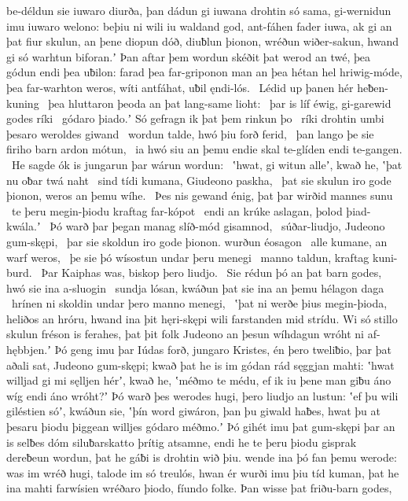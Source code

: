 be-déldun sie iuwaro diurða, þan dádun gi iuwana drohtin só sama,
gi-wernidun imu iuwaro welono: beþiu ni wili iu waldand god,
ant-fáhen fader iuwa, ak gi an þat fiur skulun,
an þene diopun dóð, diuƀlun þionon,
wréðun wiðer-sakun, hwand gi só warhtun biforan.ʼ
Þan aftar þem wordun skéðit þat werod an twé,
þea gódun endi þea uƀilon: farad þea far-griponon man
an þea hétan hel hriwig-móde,
þea far-warhton weros, wíti antfáhat,
uƀil ęndi-lós. \hld\ Lédid up þanen
hér heƀen-kuning \hld\ þea hluttaron þeoda
an þat lang-same lioht: \hld\ þar is líf éwig,
gi-garewid godes ríki \hld\ gódaro þiado.ʼ
Só gefragn ik þat þem rinkun þo \hld\ ríki drohtin
umbi þesaro weroldes giwand \hld\ wordun talde,
hwó þiu forð ferid, \hld\ þan lango þe sie firiho barn
ardon mótun, \hld\ ia hwó siu an þemu endie skal
te-glíden endi te-gangen. \hld\ He sagde ók is jungarun þar
wárun wordun: \hld\ ʽhwat, gi witun alleʼ, kwað he,
ʽþat nu oƀar twá naht \hld\ sind tídi kumana,
Giudeono paskha, \hld\ þat sie skulun iro gode þionon,
weros an þemu wíhe. \hld\ Þes nis gewand énig,
þat þar wirðid mannes sunu \hld\ te þeru megin-þiodu
kraftag far-kópot \hld\ endi an krúke aslagan,
þolod þiad-kwála.ʼ \hld\ Þó warð þar þegan manag
slíð-mód gisamnod, \hld\ súðar-liudjo,
Judeono gum-skępi, \hld\ þar sie skoldun iro gode þionon.
wurðun éosagon \hld\ alle kumane,
an warf weros, \hld\ þe sie þó wísostun
undar þeru menegi \hld\ manno taldun,
kraftag kuni-burd. \hld\ Þar Kaiphas was,
biskop þero liudjo. \hld\ Sie rédun þó an þat barn godes,
hwó sie ina a-sluogin \hld\ sundja lósan,
kwáðun þat sie ina an þemu hélagon daga \hld\ hrínen ni skoldin
undar þero manno menegi, \hld\ ʽþat ni werðe þius megin-þioda,
heliðos an hróru, hwand ina þit hęri-skępi wili
farstanden mid strídu. Wi só stillo skulun
fréson is ferahes, þat þit folk Judeono
an þesun wíhdagun wróht ni af-hębbjen.ʼ
Þó geng imu þar Iúdas forð, jungaro Kristes,
én þero tweliƀio, þar þat aðali sat,
Judeono gum-skępi; kwað þat he is im gódan rád
sęggjan mahti: ʽhwat willjad gi mi sęlljen hérʼ, kwað he,
ʽméðmo te médu, ef ik iu þene man giƀu
áno wíg endi áno wróht?ʼ Þó warð þes werodes hugi,
þero liudjo an lustun: ʽef þu wili giléstien sóʼ, kwáðun sie,
ʽþín word giwáron, þan þu giwald haƀes,
hwat þu at þesaru þiodu þiggean willjes
gódaro méðmo.ʼ Þó gihét imu þat gum-skępi þar
an is selƀes dóm siluƀarskatto
þrítig atsamne, endi he te þeru þiodu gisprak
dereƀeun wordun, þat he gáƀi is drohtin wið þiu.
wende ina þó fan þemu werode: was im wréð hugi,
talode im só treulós, hwan ér wurði imu þiu tíd kuman,
þat he ina mahti farwísien wréðaro þiodo,
fíundo folke. Þan wisse þat friðu-barn godes,
